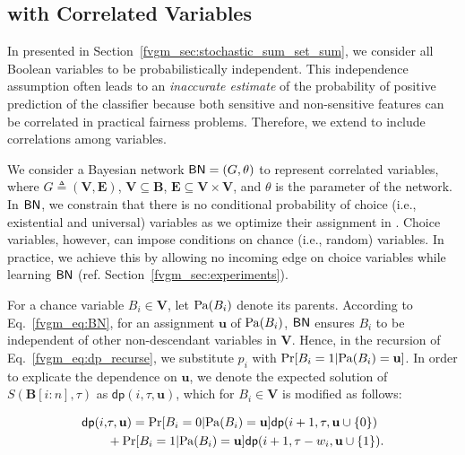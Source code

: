 	
\subsection{{\stochastic} with Correlated Variables} 
\label{fvgm_sec:dp_with_BN}
In {\stochastic} presented in Section~\ref{fvgm_sec:stochastic_sum_set_sum}, we consider all  Boolean variables to be probabilistically independent. This independence assumption often leads to an \textit{inaccurate estimate} of the probability of positive prediction of the classifier because both sensitive and non-sensitive features can be correlated in practical fairness problems. Therefore, we extend {\stochastic} to include correlations among variables.

We consider a Bayesian network $ \mathsf{BN} = (G, \theta) $ to represent correlated variables, where $ G \triangleq (\mathbf{V}, \mathbf{E}) $, $ \mathbf{V} \subseteq \mathbf{B} $, $ \mathbf{E} \subseteq \mathbf{V} \times \mathbf{V}  $, and $ \theta $ is the parameter of the network.  In  $ \mathsf{BN} $, we constrain that there is no conditional probability of choice (i.e., existential and universal) variables as we optimize their assignment in {\stochastic}. Choice variables, however, can impose conditions on chance (i.e., random) variables. In practice, we achieve this by allowing no incoming edge on choice variables while learning $ \mathsf{BN} $ (ref. Section~\ref{fvgm_sec:experiments}).
   	
   	

For a chance variable $ B_i \in \mathbf{V} $, let $ \mathrm{Pa}(B_i) $ denote its parents. According to Eq.~\eqref{fvgm_eq:BN},  for an assignment $ \mathbf{u} $ of $ \mathrm{Pa}(B_i) $, $ \mathsf{BN} $ ensures $ B_i $ to be independent of other non-descendant variables in $ \mathbf{V} $. Hence, in the recursion of Eq.~\eqref{fvgm_eq:dp_recurse}, we substitute  $ p_i $  with  $ \Pr[B_i = 1| \mathrm{Pa}(B_i) = \mathbf{u}] $. In order to explicate the dependence on $ \mathbf{u} $, we denote the expected solution of $ S(\mathbf{B}[i:n], \tau) $ as 
$ \mathsf{dp}(i, \tau, \mathbf{u}) $, which for $ B_i \in \mathbf{V} $ is modified as follows:

\begin{align*}
	\mathsf{dp}(i,  &\tau, \mathbf{u}) = \Pr[B_i = 0| \mathrm{Pa}(B_i) = \mathbf{u}] \mathsf{dp}(i+1, \tau, \mathbf{u} \cup \{0\})  \\
	& + \Pr[B_i = 1| \mathrm{Pa}(B_i) = \mathbf{u}]  \mathsf{dp}(i+1, \tau-w_i, \mathbf{u} \cup \{1\}).
\end{align*}

